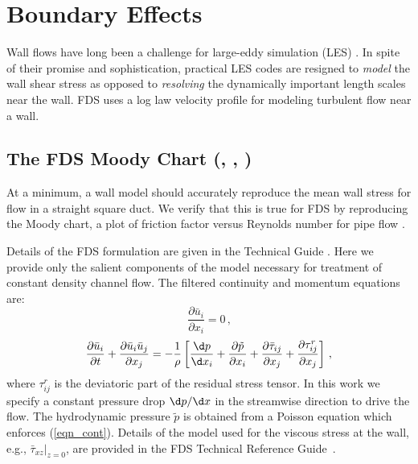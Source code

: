 \documentclass[11pt]{book}
\begin{document}
\chapter{Boundary Effects}

Wall flows have long been a challenge for large-eddy simulation (LES) \cite{Baggett:1997,Baggett:1998,Cabot:1995,Pope:2000,Sagaut:2001}.  In spite of their promise and sophistication, practical LES codes are resigned to \emph{model} the wall shear stress as opposed to \emph{resolving} the dynamically important length scales near the wall. FDS uses a log law velocity profile \cite{Pope:2000} for modeling turbulent flow near a wall.

\section{The FDS Moody Chart (\texorpdfstring{}{poiseuille}, \texorpdfstring{}{smoothwall}, \texorpdfstring{}{z0})}
\label{fds_moody_chart}

At a minimum, a wall model should accurately reproduce the mean wall stress for flow in a straight square duct.  We verify that this is true for FDS by reproducing the Moody chart, a plot of friction factor versus Reynolds number for pipe flow \cite{Moody:1944}.

Details of the FDS formulation are given in the Technical Guide \cite{FDS_Math_Guide}.  Here we provide only the salient components of the model necessary for treatment of constant density channel flow. The filtered continuity and momentum equations are:
\begin{equation}
\label{eqn_cont}
\frac{\partial \bar{u}_i}{\partial x_i} = 0 \,\mbox{,}
\end{equation}
\begin{equation}
\label{eqn_mom1}
\frac{\partial \bar{u}_i}{\partial t} + \frac{\partial \bar{u}_i \bar{u}_j}{\partial x_j} = -\frac{1}{\rho} \left[ \frac{\d p}{\d x_i} + \frac{\partial \tilde{p}}{\partial x_i} + \frac{\partial \bar{\tau}_{ij}}{\partial x_j} + \frac{\partial \tau_{ij}^{r}}{\partial x_j} \right]\,\mbox{,}
\end{equation}
where $\tau_{ij}^{r}$ is the deviatoric part of the residual stress tensor.  In this work we specify a constant pressure drop $\d p/\d x$ in the streamwise direction to drive the flow.  The hydrodynamic pressure $\tilde{p}$ is obtained from a Poisson equation which enforces (\ref{eqn_cont}). Details of the model used for the viscous stress at the wall, e.g., $\bar{\tau}_{xz}|_{z=0}$, are provided in the FDS Technical Reference Guide~\cite{FDS_Tech_Guide}.
\end{document}
